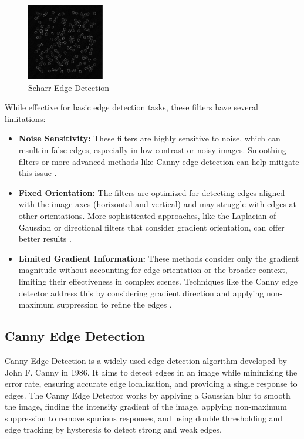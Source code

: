 \documentclass[%
	a4paper, %
	12pt, %
	english, %
	bibtotoc %
]{scrartcl}
\begin{document}
\begin{figure}[H]
    \centering
    \includegraphics[width=0.3\textwidth]{latex-template-ss24/images/Prewitt_edge_detection.png}
    \caption{Scharr Edge Detection}
    \label{fig:prewitt_edge_detection}
\end{figure}

While effective for basic edge detection tasks, these filters have several limitations:

\begin{itemize}
    \item \textbf{Noise Sensitivity:} These filters are highly sensitive to noise, which can result in false edges, especially in low-contrast or noisy images. Smoothing filters or more advanced methods like Canny edge detection can help mitigate this issue \cite{Canny1986}.
    \item \textbf{Fixed Orientation:} The filters are optimized for detecting edges aligned with the image axes (horizontal and vertical) and may struggle with edges at other orientations. More sophisticated approaches, like the Laplacian of Gaussian or directional filters that consider gradient orientation, can offer better results \cite{Marr1980}.
    \item \textbf{Limited Gradient Information:} These methods consider only the gradient magnitude without accounting for edge orientation or the broader context, limiting their effectiveness in complex scenes. Techniques like the Canny edge detector address this by considering gradient direction and applying non-maximum suppression to refine the edges \cite{Canny1986}.
\end{itemize}


\subsection{Canny Edge Detection}
Canny Edge Detection is a widely used edge detection algorithm developed by John F. Canny in 1986. It aims to detect edges in an image while minimizing the error rate, ensuring accurate edge localization, and providing a single response to edges. The Canny Edge Detector works by applying a Gaussian blur to smooth the image, finding the intensity gradient of the image, applying non-maximum suppression to remove spurious responses, and using double thresholding and edge tracking by hysteresis to detect strong and weak edges.
\end{document}
